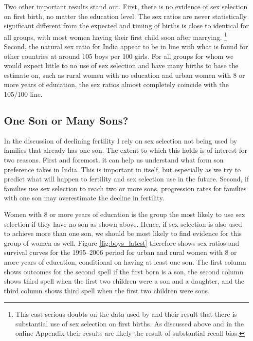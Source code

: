 \documentclass[12pt,letterpaper]{article}
\begin{document}
Two other important results stand out.
First, there is no evidence of sex selection on first birth, no matter the education
level.
The sex ratios are never statistically significant different from the expected and 
timing of births is close to identical for all groups, with most women having their 
first child soon after marrying.%
\footnote{
This cast serious doubts on the data used by \citet{jha06} and their result that 
there is substantial use of sex selection on first births.
As discussed above and in the online Appendix their results are likely the result of
substantial recall bias.
}
Second, the natural sex ratio for India appear to be in line with what is found for 
other countries at around 105 boys per 100 girls.
For all groups for whom we would expect little to no use of sex selection and have
many births to base the estimate on, such as rural women with no education and urban
women with 8 or more years of education, the sex ratios almost completely coincide 
with the 105/100 line.


\subsection{One Son or Many Sons?}

In the discussion of declining fertility I rely on sex selection not being used by 
families that already has one son.
The extent to which this holds is of interest for two reasons.
First and foremost, it can help us understand what form son preference takes in India.
This is important in itself, but especially as we try to predict what will happen to 
fertility and sex selection use in the future.
Second,
if families use sex selection to reach two or more sons, progression rates for families 
with one son may overestimate the decline in fertility.

Women with 8 or more years of education is the group the most likely to use sex 
selection if they have no son as shown above.
Hence, if sex selection is also used to achieve more than one son, we should be
most likely to find evidence for this group of women as well.
Figure \ref{fig:boys_latest} therefore shows sex ratios and survival curves for 
the 1995--2006 period for urban and rural women with 8 or more years of education, 
conditional on having at least one son.
The first column shows outcomes for the second spell if the first born is a son,
the second column shows third spell when the first two children were a son and 
a daughter, and the third column shows third spell when the first two children were sons.
\end{document}
